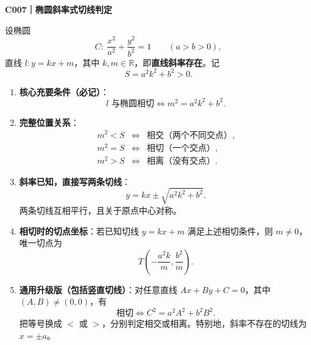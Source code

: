 \begin{statementbox}
\textbf{C007｜椭圆斜率式切线判定}\par
设椭圆
\[
C:\ \frac{x^2}{a^2}+\frac{y^2}{b^2}=1\qquad(a>b>0),
\]
直线 $l:y=kx+m$，其中 $k,m\in\mathbb R$，即\textbf{直线斜率存在}。记
\[
S=a^2k^2+b^2>0.
\]
\begin{enumerate}
    \item \textbf{核心充要条件（必记）}：
    \[
    \boxed{l\text{ 与椭圆相切}\iff m^2=a^2k^2+b^2.}
    \]

    \item \textbf{完整位置关系}：
    \[
    \begin{array}{ccl}
    m^2<S&\iff&\text{相交（两个不同交点）},\\
    m^2=S&\iff&\text{相切（一个交点）},\\
    m^2>S&\iff&\text{相离（没有交点）}.
    \end{array}
    \]

    \item \textbf{斜率已知，直接写两条切线}：
    \[
    \boxed{y=kx\pm\sqrt{a^2k^2+b^2}.}
    \]
    两条切线互相平行，且关于原点中心对称。

    \item \textbf{相切时的切点坐标}：若已知切线 $y=kx+m$ 满足上述相切条件，则 $m\ne0$，唯一切点为
    \[
    \boxed{T\left(-\frac{a^2k}{m},\frac{b^2}{m}\right).}
    \]

    \item \textbf{通用升级版（包括竖直切线）}：对任意直线 $Ax+By+C=0$，其中 $(A,B)\ne(0,0)$，有
    \[
    \boxed{\text{相切}\iff C^2=a^2A^2+b^2B^2.}
    \]
    把等号换成 $<$ 或 $>$，分别判定相交或相离。特别地，斜率不存在的切线为 $x=\pm a$。
\end{enumerate}
\end{statementbox}
